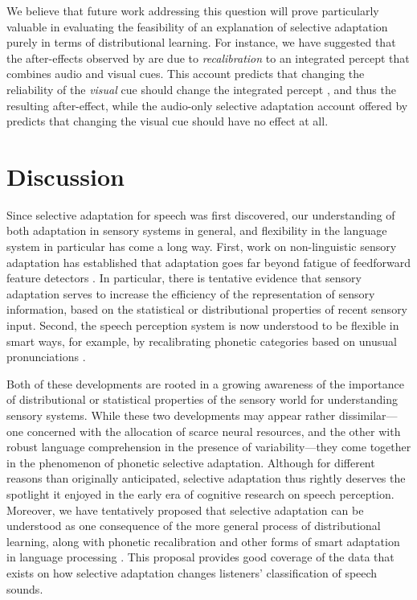 We believe that future work addressing this question will prove particularly valuable in evaluating the feasibility of an explanation of selective adaptation purely in terms of distributional learning. For instance, we have suggested that the after-effects observed by \textcite{Saldana1994} are due to \emph{recalibration} to an integrated percept that combines audio and visual cues.  This account predicts that changing the reliability of the \emph{visual} cue should change the integrated percept \autocite[as observed by][]{Bejjanki2011,Ernst2004}, and thus the resulting after-effect, while the audio-only selective adaptation account offered by \textcite{Saldana1994} predicts that changing the visual cue should have no effect at all.


\section{Discussion}
\label{sec:discussion}

Since selective adaptation for speech was first discovered, our understanding of both adaptation in sensory systems in general, and flexibility in the language system in particular has come a long way.  First, work on non-linguistic sensory adaptation has established that adaptation goes far beyond fatigue of feedforward feature detectors \autocite{Brenner2000,Dragoi2000,Fairhall2001,Gutfreund2012,Kohn2004,Kohn2007,Sharpee2006,Webster2005}.  In particular, there is tentative evidence that sensory adaptation serves to increase the efficiency of the representation of sensory information, based on the statistical or distributional properties of recent sensory input.  Second, the speech perception system is now understood to be flexible in smart ways, for example, by recalibrating phonetic categories based on unusual pronunciations \autocite{Bertelson2003,Kraljic2005,Norris2003}.

Both of these developments are rooted in a growing awareness of the importance of distributional or statistical properties of the sensory world for understanding sensory systems.  While these two developments may appear rather dissimilar---one concerned with the allocation of scarce neural resources, and the other with robust language comprehension in the presence of variability---they come together in the phenomenon of phonetic selective adaptation. Although for different reasons than originally anticipated, selective adaptation thus rightly deserves the spotlight it enjoyed in the early era of cognitive research on speech perception.  Moreover, we have tentatively proposed that selective adaptation can be understood as one consequence of the more general process of distributional learning, along with phonetic recalibration and other forms of smart adaptation in language processing \autocite{Kleinschmidt2015}.  This proposal provides good coverage of the data that exists on how selective adaptation changes listeners' classification of speech sounds.

